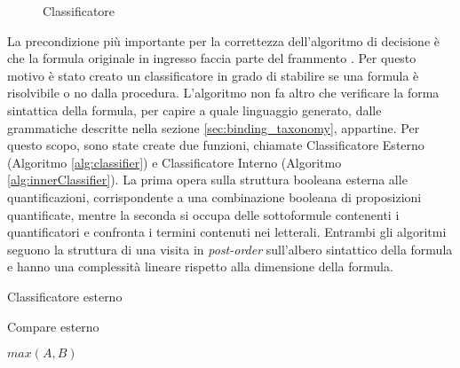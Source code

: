 \documentclass[./main.tex]{subfiles}
\begin{document}
\begin{figure}[H]
    \centering
    \scalebox{0.55}{
        
    }
    \caption{Classificatore}
    \label{fig:classifier}
\end{figure}

La precondizione più importante per la correttezza dell'algoritmo di decisione è che la formula originale in ingresso faccia parte del frammento \cb.
Per questo motivo è stato creato un classificatore in grado di stabilire se una formula è risolvibile o no dalla procedura.
L'algoritmo non fa altro che verificare la forma sintattica della formula, 
per capire a quale linguaggio generato, dalle grammatiche descritte nella sezione \ref{sec:binding_taxonomy}, appartine.
Per questo scopo, sono state create due funzioni, chiamate Classificatore Esterno (Algoritmo \ref{alg:classifier}) e Classificatore Interno (Algoritmo \ref{alg:innerClassifier}).
La prima opera sulla struttura booleana esterna alle quantificazioni, 
corrispondente a una combinazione booleana di proposizioni quantificate, 
mentre la seconda si occupa delle sottoformule contenenti i quantificatori 
e confronta i termini contenuti nei letterali.
Entrambi gli algoritmi seguono la struttura di una visita in \textit{post-order}
sull'albero sintattico della formula
e hanno una complessità lineare rispetto alla dimensione della formula.


\begin{algorithm}[H] \label{alg:classifier}
\caption{Classificatore esterno}

\end{algorithm}
\begin{algorithm}[H] \label{alg:compare}
    \caption{Compare esterno}
\Return $max(A, B)$\;

\end{algorithm}
\end{document}
